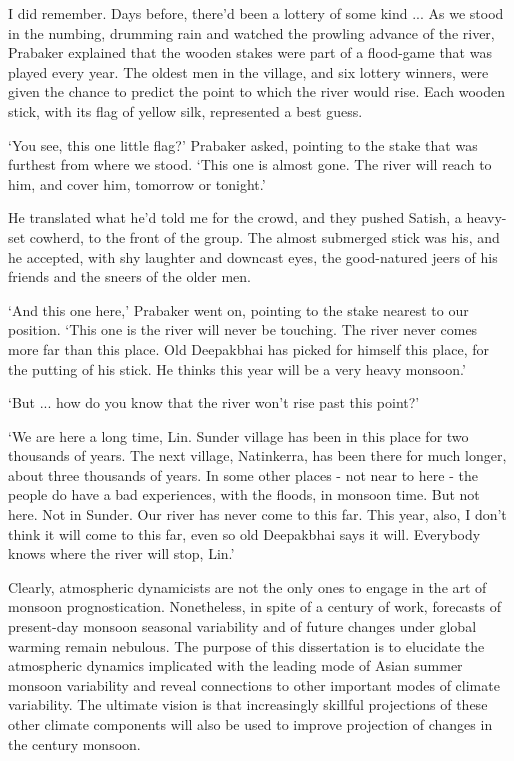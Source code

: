 {	I did remember. Days before, there'd been a lottery of some kind ... As we stood in the numbing, drumming rain and watched the prowling advance of the river, Prabaker explained that the wooden stakes were part of a flood-game that was played every year. The oldest men in the village, and six lottery winners, were given the chance to predict the point to which the river would rise. Each wooden stick, with its flag of yellow silk, represented a best guess.
	
	`You see, this one little flag?' Prabaker asked, pointing to the stake that was furthest from where we stood. `This one is almost gone. The river will reach to him, and cover him, tomorrow or tonight.' 
	
	He translated what he'd told me for the crowd, and they pushed Satish, a heavy-set cowherd, to the front of the group. The almost submerged stick was his, and he accepted, with shy laughter and downcast eyes, the good-natured jeers of his friends and the sneers of the older men.
	
	`And this one here,' Prabaker went on, pointing to the stake nearest to our position. `This one is the river will never be touching. The river never comes more far than this place. Old Deepakbhai has picked for himself this place, for the putting of his stick. He thinks this year will be a very heavy monsoon.'
	
	
	`But ... how do you know that the river won't rise past this point?'
	
	`We are here a long time, Lin. Sunder village has been in this place for two thousands of years. The next village, Natinkerra, has been there for much longer, about three thousands of years. In some other places - not near to here - the people do have a bad experiences, with the floods, in monsoon time. But not here. Not in Sunder. Our river has never come to this far. This year, also, I don't think it will come to this far, even so old Deepakbhai says it will. Everybody knows where the river will stop, Lin.' }
	
	Clearly, atmospheric dynamicists are not the only ones to engage in the art of monsoon prognostication. Nonetheless, in spite of a century of work, forecasts of present-day monsoon seasonal variability and of future changes under global warming remain nebulous. The purpose of this dissertation is to elucidate the atmospheric dynamics implicated with the leading mode of Asian summer monsoon variability and reveal connections to other important modes of climate variability. The ultimate vision is that increasingly skillful projections of these other climate components will also be used to improve projection of changes in the  century monsoon.

